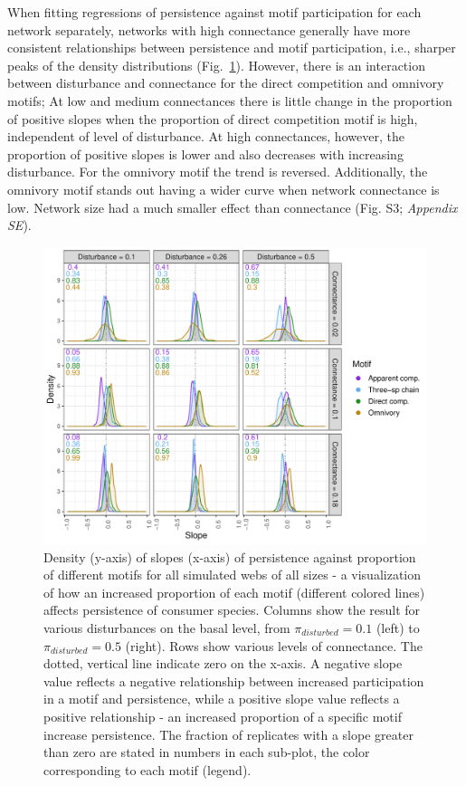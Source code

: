 \documentclass[12pt]{article}
\begin{document}
\begin{spacing}{2.0}
            When fitting regressions of persistence against motif participation for each network separately, networks with high connectance generally have more consistent relationships between persistence and motif participation, i.e., sharper peaks of the density distributions (Fig.~\ref{fig:density_prop_C}). However, there is an interaction between disturbance and connectance for the direct competition and omnivory motifs; At low and medium connectances there is little change in the proportion of positive slopes when the proportion of  direct competition motif is high, independent of level of disturbance. At high connectances, however, the proportion of positive slopes is lower and also decreases with increasing disturbance. For the omnivory motif the trend is reversed. Additionally, the omnivory motif stands out having a wider curve when network connectance is low. 
            Network size had a much smaller effect than connectance (Fig. S3; \emph{Appendix SE}).


        \begin{figure}[h!]
            \centering
            \includegraphics[width=\textwidth]{figures/prop_dens_bp_vs_C_allS.pdf}
            \caption{Density (y-axis) of slopes (x-axis) of persistence against proportion of different motifs for all simulated webs of all sizes - a visualization of how an increased proportion of each motif (different colored lines) affects persistence of consumer species. Columns show the result for various disturbances on the basal level, from $\pi_{disturbed} = 0.1$ (left) to $\pi_{disturbed} = 0.5$ (right). Rows show various levels of connectance. The dotted, vertical line indicate zero on the x-axis. A negative slope value reflects a negative relationship between increased participation in a motif and persistence, while a positive slope value reflects a positive relationship - an increased proportion of a specific motif increase persistence. The fraction of replicates with a slope greater than zero are stated in numbers in each sub-plot, the color corresponding to each motif (legend). }
            \label{fig:density_prop_C}
        \end{figure}    
    

\end{spacing}
\end{document}
